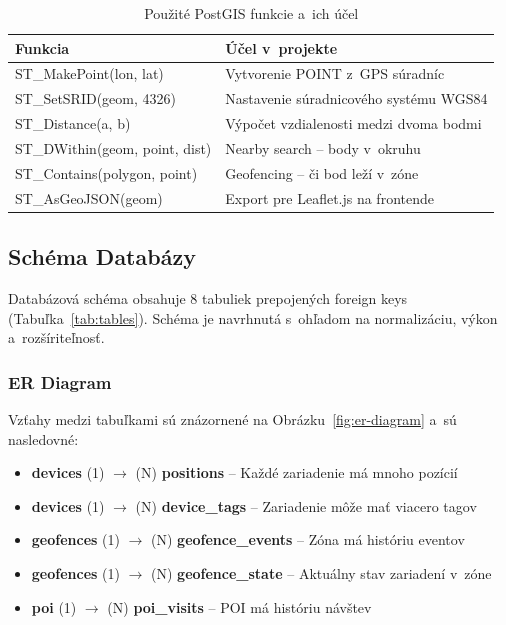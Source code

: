 \begin{table}[htbp]
    \centering
    \begin{tabular}{|l|p{7cm}|}
        \hline
        \textbf{Funkcia} & \textbf{Účel v~projekte} \\
        \hline
        ST\_MakePoint(lon, lat) & Vytvorenie POINT z~GPS súradníc \\
        ST\_SetSRID(geom, 4326) & Nastavenie súradnicového systému WGS84 \\
        ST\_Distance(a, b) & Výpočet vzdialenosti medzi dvoma bodmi \\
        ST\_DWithin(geom, point, dist) & Nearby search -- body v~okruhu \\
        ST\_Contains(polygon, point) & Geofencing -- či bod leží v~zóne \\
        ST\_AsGeoJSON(geom) & Export pre Leaflet.js na frontende \\
        \hline
    \end{tabular}
    \caption{Použité PostGIS funkcie a~ich účel}
    \label{tab:postgis-functions}
\end{table}

\subsection{Schéma Databázy}
\label{sec:Schema}

Databázová schéma obsahuje 8 tabuliek prepojených foreign keys (Tabuľka~\ref{tab:tables}). Schéma je navrhnutá s~ohľadom na normalizáciu, výkon a~rozšíriteľnosť.

\subsubsection{ER Diagram}

Vzťahy medzi tabuľkami sú znázornené na Obrázku~\ref{fig:er-diagram} a~sú nasledovné:

\begin{itemize}
    \item \textbf{devices} (1) $\rightarrow$ (N) \textbf{positions} -- Každé zariadenie má mnoho pozícií
    \item \textbf{devices} (1) $\rightarrow$ (N) \textbf{device\_tags} -- Zariadenie môže mať viacero tagov
    \item \textbf{geofences} (1) $\rightarrow$ (N) \textbf{geofence\_events} -- Zóna má históriu eventov
    \item \textbf{geofences} (1) $\rightarrow$ (N) \textbf{geofence\_state} -- Aktuálny stav zariadení v~zóne
    \item \textbf{poi} (1) $\rightarrow$ (N) \textbf{poi\_visits} -- POI má históriu návštev
\end{itemize}

